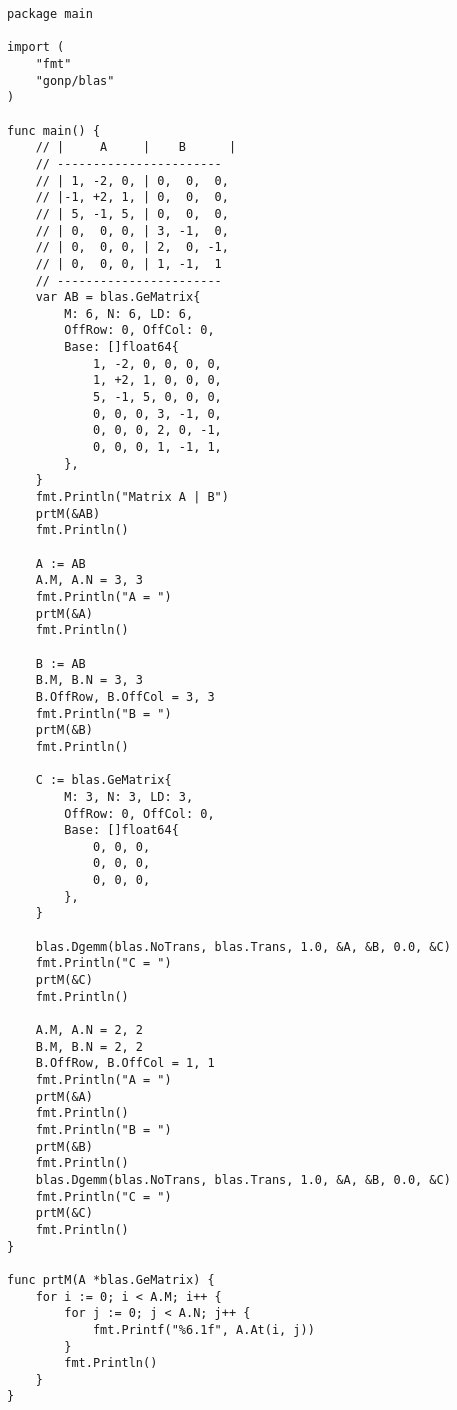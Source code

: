 \documentclass[a6paper,titlepage,landscape,oneside,12pt]{book}
\begin{document}
\begin{lstlisting}
package main

import (
	"fmt"
	"gonp/blas"
)

func main() {
	// |     A     |    B      |
	// -----------------------
	// | 1, -2, 0, | 0,  0,  0,
	// |-1, +2, 1, | 0,  0,  0,
	// | 5, -1, 5, | 0,  0,  0,
	// | 0,  0, 0, | 3, -1,  0,
	// | 0,  0, 0, | 2,  0, -1,
	// | 0,  0, 0, | 1, -1,  1
	// -----------------------
	var AB = blas.GeMatrix{
		M: 6, N: 6, LD: 6,
		OffRow: 0, OffCol: 0,
		Base: []float64{
			1, -2, 0, 0, 0, 0,
			1, +2, 1, 0, 0, 0,
			5, -1, 5, 0, 0, 0,
			0, 0, 0, 3, -1, 0,
			0, 0, 0, 2, 0, -1,
			0, 0, 0, 1, -1, 1,
		},
	}
	fmt.Println("Matrix A | B")
	prtM(&AB)
	fmt.Println()

	A := AB
	A.M, A.N = 3, 3
	fmt.Println("A = ")
	prtM(&A)
	fmt.Println()

	B := AB
	B.M, B.N = 3, 3
	B.OffRow, B.OffCol = 3, 3
	fmt.Println("B = ")
	prtM(&B)
	fmt.Println()

	C := blas.GeMatrix{
		M: 3, N: 3, LD: 3,
		OffRow: 0, OffCol: 0,
		Base: []float64{
			0, 0, 0,
			0, 0, 0,
			0, 0, 0,
		},
	}

	blas.Dgemm(blas.NoTrans, blas.Trans, 1.0, &A, &B, 0.0, &C)
	fmt.Println("C = ")
	prtM(&C)
	fmt.Println()

	A.M, A.N = 2, 2
	B.M, B.N = 2, 2
	B.OffRow, B.OffCol = 1, 1
	fmt.Println("A = ")
	prtM(&A)
	fmt.Println()
	fmt.Println("B = ")
	prtM(&B)
	fmt.Println()
	blas.Dgemm(blas.NoTrans, blas.Trans, 1.0, &A, &B, 0.0, &C)
	fmt.Println("C = ")
	prtM(&C)
	fmt.Println()
}

func prtM(A *blas.GeMatrix) {
	for i := 0; i < A.M; i++ {
		for j := 0; j < A.N; j++ {
			fmt.Printf("%6.1f", A.At(i, j))
		}
		fmt.Println()
	}
}


\end{lstlisting}
\end{document}
